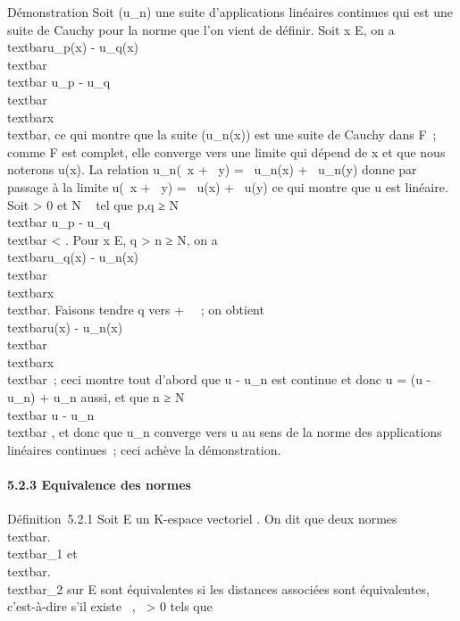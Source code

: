 \documentclass[]{article}
\begin{document}
Démonstration Soit (u\_n) une suite d'applications linéaires
continues qui est une suite de Cauchy pour la norme que l'on vient de
définir. Soit x \in E, on a \\textbar{}u\_p(x) -
u\_q(x)\\textbar{} \leq\\textbar{}
u\_p -
u\_q\\textbar{}\,\\textbar{}x\\textbar{},
ce qui montre que la suite (u\_n(x)) est une suite de Cauchy
dans F~; comme F est complet, elle converge vers une limite qui dépend
de x et que nous noterons u(x). La relation u\_n(\alpha~x + \beta~y) =
\alpha~u\_n(x) + \beta~u\_n(y) donne par passage à la limite u(\alpha~x +
\beta~y) = \alpha~u(x) + \beta~u(y) ce qui montre que u est linéaire. Soit \epsilon
\textgreater{} 0 et N \in {}~ tel que p,q ≥ N \rigtharrow~\\textbar{}
u\_p - u\_q\\textbar{} \textless{} \epsilon.
Pour x \in E, q \textgreater{} n ≥ N, on a
\\textbar{}u\_q(x) -
u\_n(x)\\textbar{} \leq
\epsilon\\textbar{}x\\textbar{}. Faisons tendre q
vers + \infty~~; on obtient \\textbar{}u(x) -
u\_n(x)\\textbar{} \leq
\epsilon\\textbar{}x\\textbar{}~; ceci montre
tout d'abord que u - u\_n est continue et donc u = (u -
u\_n) + u\_n aussi, et que n ≥ N
\rigtharrow~\\textbar{} u - u\_n\\textbar{} \leq
\epsilon, et donc que u\_n converge vers u au sens de la norme des
applications linéaires continues~; ceci achève la démonstration.

\paragraph{5.2.3 Equivalence des normes}

Définition~5.2.1 Soit E un K-espace vectoriel . On dit que deux normes
\\textbar{}.\\textbar{}\_1 et
\\textbar{}.\\textbar{}\_2 sur E
sont équivalentes si les distances associées sont équivalentes,
c'est-à-dire s'il existe \alpha~,\beta~ \textgreater{} 0 tels que
\end{document}

